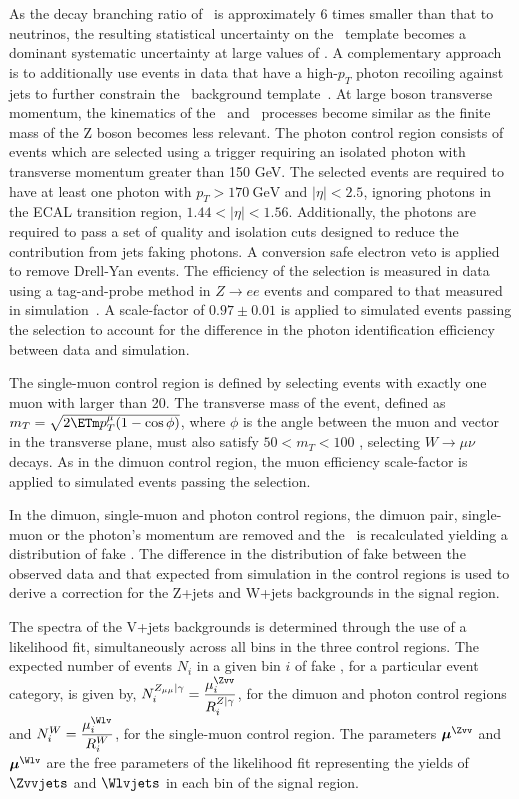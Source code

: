 As the decay branching ratio of \Zmm~is approximately 6 times smaller than that to neutrinos, the resulting statistical 
uncertainty on the \Zvvjets~template becomes a dominant systematic uncertainty at large values of \ETm.
A complementary approach is to additionally use events in data that have a high-$p_{T}$ 
photon recoiling against jets to further 
constrain the \Zvvjets~background template~\cite{CMS-PAS-SUS-08-002}. At large boson transverse momentum, the kinematics 
of the \phojets~and \Zjets~processes become similar as the finite mass of the 
Z boson becomes less relevant. The photon control region consists of events which are selected using a trigger requiring an 
isolated  photon with transverse momentum greater than 150 GeV. 
The selected events are required to have at least one photon with $p_{T} > 170~\textrm{GeV}$ and 
$|\eta|<2.5$, ignoring photons in the ECAL transition region, $1.44 < |\eta|< 1.56$. 
Additionally, the photons are required to pass a set of quality and isolation cuts designed 
to reduce the contribution from jets faking photons. A conversion safe electron veto is 
applied to remove Drell-Yan events. The efficiency of the selection is  
measured in data using a tag-and-probe method in $Z\rightarrow ee$ events and compared to 
that measured in simulation~\cite{photon_purity}. A scale-factor of $0.97\pm0.01$ is applied to simulated events passing the 
selection to account for the difference in the photon identification efficiency between data and simulation. 

The single-muon control region is defined by selecting events 
with exactly one muon with \pt larger than 20\gev. The transverse 
mass of the event, defined  as  $m_{T}=\sqrt{2\ETm p_{T}^{\mu} (1-\cos \phi)}$, 
where $\phi$ is the angle between the muon and \ETm vector in the transverse plane, must also satisfy $50<m_{T}<100$ \gev, 
selecting $W\rightarrow\mu\nu$ decays. As in the dimuon control region, the muon efficiency scale-factor is 
applied to simulated events passing the selection. 

In the dimuon, single-muon and photon control regions, the dimuon pair, single-muon or the photon's 
momentum are removed and the \ETm ~is recalculated yielding a distribution of fake \ETm. The difference in the distribution of fake \ETm 
between the observed data and that expected from simulation in the control regions is used to derive a correction 
for the Z+jets and W+jets backgrounds in the signal region.
 
The \ETm spectra of the V+jets backgrounds is determined through the use of a likelihood fit, simultaneously across all bins 
in the three control regions. The expected number of events $N_{i}$ in a given bin $i$ of fake \ETm, for a particular event category, is given by, 
$N^{Z_{\mu\mu}|\gamma }_{i}=  \dfrac{{\mu^{\Zvv}_{i}}}{R^{Z|\gamma}_{i}}$, 
for the dimuon and photon control regions and  $N^{W}_{i} =  \dfrac{{\mu^{\Wlv}_{i}}}{R^{W}_{i}}$,
for the single-muon control region. The parameters $\boldsymbol{\mu}^{\Zvv}$ and $\boldsymbol{\mu}^{\Wlv}$ are the free parameters 
of the likelihood fit representing the yields of $\Zvvjets$ and $\Wlvjets$ in each bin of the signal region.

